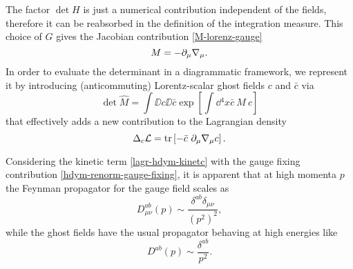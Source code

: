 The factor $\det H$ is just a numerical contribution independent of the fields, therefore it can be reabsorbed in the definition of the integration measure.
This choice of $G$ gives the Jacobian contribution \eqref{M-lorenz-gauge}
\begin{equation}
M = - \partial_\mu  { \mathcal{\nabla} }_\mu 
.
\end{equation}
In order to evaluate the determinant in a diagrammatic framework, we represent it by introducing (anticommuting) Lorentz-scalar ghost fields  $c$ and  $\bar c$ via
\begin{equation}
\det \hat M = \int \DD{c} \DD{\bar c} 
	\exp \left[ {\int \dd{^4x}  \bar c \ M \ c } \right]
\end{equation}
that effectively adds a new contribution to the Lagrangian density
\begin{equation}
\Delta_c { \mathcal{L} }
	=
\operatorname{tr} \left[ - \bar c \ \partial_\mu { \mathcal{\nabla} }_\mu c \right].
\end{equation}

Considering the kinetic term \eqref{lagr-hdym-kinetc} with the gauge fixing contribution \eqref{hdym-renorm-gauge-fixing}, it is apparent that at high momenta $p$ the Feynman propagator for the gauge field scales as
\begin{equation}
D^{ab}_{\mu\nu}(p) \sim  \frac{ \delta^{ab} \delta_{\mu\nu} }{(p^2)^2},
\end{equation}
while the ghost fields have the usual propagator behaving at high energies like
\begin{equation}
D^{ab}(p) \sim  \frac{ \delta^{ab} }{{p}^2}.
\end{equation}


